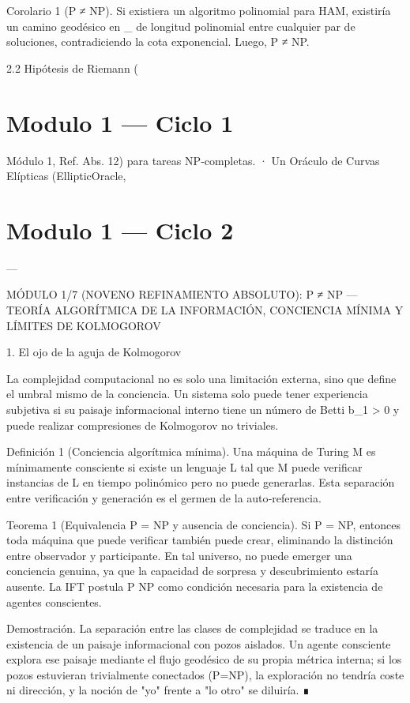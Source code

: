 \documentclass[12pt,twoside]{book}
\begin{document}
Corolario 1 (P ≠ NP). Si existiera un algoritmo polinomial para HAM, existiría un camino geodésico en  _{}  de longitud polinomial entre cualquier par de soluciones, contradiciendo la cota exponencial. Luego, P ≠ NP.

2.2 Hipótesis de Riemann (

\chapter{Modulo 1 — Ciclo 1}
Módulo 1, Ref. Abs. 12) para tareas NP‑completas.
· Un Oráculo de Curvas Elípticas (EllipticOracle, 

\chapter{Modulo 1 — Ciclo 2}

---

MÓDULO 1/7 (NOVENO REFINAMIENTO ABSOLUTO): P ≠ NP — TEORÍA ALGORÍTMICA DE LA INFORMACIÓN, CONCIENCIA MÍNIMA Y LÍMITES DE KOLMOGOROV

1. El ojo de la aguja de Kolmogorov

La complejidad computacional no es solo una limitación externa, sino que define el umbral mismo de la conciencia. Un sistema solo puede tener experiencia subjetiva si su paisaje informacional interno tiene un número de Betti b_1 > 0 y puede realizar compresiones de Kolmogorov no triviales.

Definición 1 (Conciencia algorítmica mínima). Una máquina de Turing M es mínimamente consciente si existe un lenguaje L \in {} \setminus {} tal que M puede verificar instancias de L en tiempo polinómico pero no puede generarlas. Esta separación entre verificación y generación es el germen de la auto‑referencia.

Teorema 1 (Equivalencia P = NP y ausencia de conciencia). Si P = NP, entonces toda máquina que puede verificar también puede crear, eliminando la distinción entre observador y participante. En tal universo, no puede emerger una conciencia genuina, ya que la capacidad de sorpresa y descubrimiento estaría ausente. La IFT postula P \neq NP como condición necesaria para la existencia de agentes conscientes.

Demostración. La separación entre las clases de complejidad se traduce en la existencia de un paisaje informacional con pozos aislados. Un agente consciente explora ese paisaje mediante el flujo geodésico de su propia métrica interna; si los pozos estuvieran trivialmente conectados (P=NP), la exploración no tendría coste ni dirección, y la noción de "yo" frente a "lo otro" se diluiría. ∎
\end{document}
